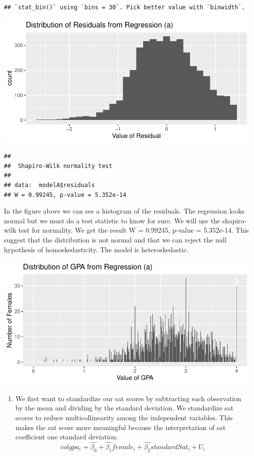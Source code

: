 \documentclass[
  12pt,
  landscape]{article}
\providecommand{\tightlist}{%
  \setlength{\itemsep}{0pt}\setlength{\parskip}{0pt}}
\begin{document}
\begin{verbatim}
## `stat_bin()` using `bins = 30`. Pick better value with `binwidth`.
\end{verbatim}

\includegraphics{Ogle_MicroMetricsAssignment_2_Q1_files/figure-latex/unnamed-chunk-3-1.pdf}

\begin{verbatim}
## 
##  Shapiro-Wilk normality test
## 
## data:  modelA$residuals
## W = 0.99245, p-value = 5.352e-14
\end{verbatim}

In the figure above we can see a histogram of the residuals. The
regression looks normal but we must do a test statistic to know for
sure. We will use the shapiro-wilk test for normality. We get the result
W = 0.99245, p-value = 5.352e-14. This suggest that the distribution is
not normal and that we can reject the null hypothesis of
homoskedasticity. The model is heteroskedastic.

\includegraphics{Ogle_MicroMetricsAssignment_2_Q1_files/figure-latex/unnamed-chunk-4-1.pdf}

\begin{enumerate}
\def\labelenumi{(\alph{enumi})}
\setcounter{enumi}{2}
\tightlist
\item
  We first want to standardize our sat scores by subtracting each
  observation by the mean and dividing by the standard deviation. We
  standardize sat scores to reduce multicollinearity among the
  independent variables. This makes the sat score more meaningful
  because the interpretation of sat coefficient one standard
  deviation.\\
  \[
  colgpa_i = \hat{\beta_0} + \hat{\beta_1}female_i + \hat{\beta_2}standardSat_i+ U_i
  \]
\end{enumerate}
\end{document}
